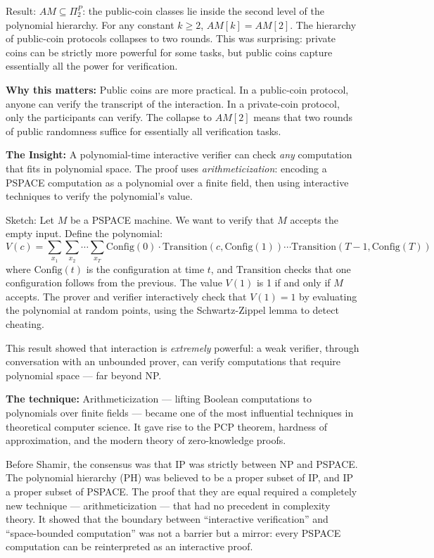 Result: $AM \subseteq \Pi_2^P$: the public-coin classes lie inside the second level of the polynomial hierarchy. For any constant $k \ge 2$, $AM[k] = AM[2]$. The hierarchy of public-coin protocols collapses to two rounds. This was surprising: private coins can be strictly more powerful for some tasks, but public coins capture essentially all the power for verification.

\textbf{Why this matters:} Public coins are more practical. In a public-coin protocol, anyone can verify the transcript of the interaction. In a private-coin protocol, only the participants can verify. The collapse to $AM[2]$ means that two rounds of public randomness suffice for essentially all verification tasks.

\textbf{The Insight:} A polynomial-time interactive verifier can check \emph{any} computation that fits in polynomial space. The proof uses \emph{arithmeticization}: encoding a PSPACE computation as a polynomial over a finite field, then using interactive techniques to verify the polynomial's value.

Sketch: Let $M$ be a PSPACE machine. We want to verify that $M$ accepts the empty input. Define the polynomial:
\[
V(c) = \sum_{x_1} \sum_{x_2} \cdots \sum_{x_T} \text{Config}(0) \cdot \text{Transition}(c, \text{Config}(1)) \cdots \text{Transition}(T-1, \text{Config}(T))
\]
where $\text{Config}(t)$ is the configuration at time $t$, and $\text{Transition}$ checks that one configuration follows from the previous. The value $V(1)$ is 1 if and only if $M$ accepts. The prover and verifier interactively check that $V(1) = 1$ by evaluating the polynomial at random points, using the Schwartz-Zippel lemma to detect cheating.

This result showed that interaction is \emph{extremely} powerful: a weak verifier, through conversation with an unbounded prover, can verify computations that require polynomial space --- far beyond NP.

\textbf{The technique:} Arithmeticization --- lifting Boolean computations to polynomials over finite fields --- became one of the most influential techniques in theoretical computer science. It gave rise to the PCP theorem, hardness of approximation, and the modern theory of zero-knowledge proofs.

Before Shamir, the consensus was that IP was strictly between NP and PSPACE. The polynomial hierarchy (PH) was believed to be a proper subset of IP, and IP a proper subset of PSPACE. The proof that they are equal required a completely new technique --- arithmeticization --- that had no precedent in complexity theory. It showed that the boundary between ``interactive verification'' and ``space-bounded computation'' was not a barrier but a mirror: every PSPACE computation can be reinterpreted as an interactive proof.

